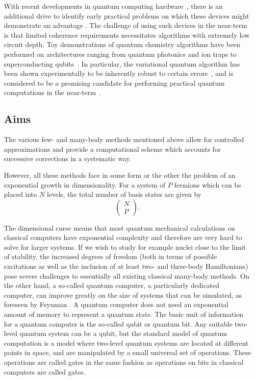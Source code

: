 \documentclass[10pt]{article}
\begin{document}
With recent developments in quantum computing
hardware~\cite{Corcoles2015,Riste2015,Kelly2015,Barends2016,Roushan2017},
there is an additional drive to identify early practical problems on
which these devices might demonstrate an advantage
\cite{Mohseni2017,Boixo2016}. The challenge of using such devices in
the near-term is that limited coherence requirements necessitates
algorithms with extremely low circuit depth. Toy demonstrations of
quantum chemistry algorithms have been performed on architectures
ranging from quantum photonics and ion traps to superconducting
qubits~\cite{Lanyon2010,Li2011,Wang2014,Peruzzo2013,Shen2015,OMalley2016,Kandala2017}. In
particular, the variational quantum algorithm
\cite{Peruzzo2013,McClean2015} has been shown experimentally to be
inherently robust to certain errors~\cite{OMalley2016}, and is
considered to be a promising candidate for performing practical
quantum computations in the near-term~\cite{Wecker2015a,Mueck2015}.

\subsection{Aims}

The various few- and many-body methods mentioned above allow for
controlled approximations and provide a computational scheme which
accounts for successive corrections in a systematic way.

However, all these methods face in some form or the other the problem
of an exponential growth in dimensionality. For a system of $P$
fermions which can be placed into $N$ levels, the total number of
basis states are given by
\[ \left(\begin{array}{c}N\\P\end{array}\right).  \]

The dimensional curse means that most quantum mechanical calculations
on classical computers have exponential complexity and therefore are
very hard to solve for larger systems.  If we wish to study for
example nuclei close to the limit of stability, the increased degrees
of freedom (both in terms of possible excitations as well as the
inclusion of at least two- and three-body Hamiltonians) pose severe
challenges to essentially all existing classical many-body methods.
On the other hand, a so-called quantum computer, a particularly
dedicated computer, can improve greatly on the size of systems that
can be simulated, as foreseen by Feynman
\cite{feynman1982,feynman1986}. A quantum computer does not need an
exponential amount of memory to represent a quantum state.  The basic
unit of information for a quantum computer is the so-called qubit or
quantum bit. Any suitable two-level quantum system can be a qubit, but
the standard model of quantum computation is a model where two-level
quantum systems are located at different points in space, and are
manipulated by a small universal set of operations.  These operations
are called gates in the same fashion as operations on bits in
classical computers are called gates.
\end{document}
